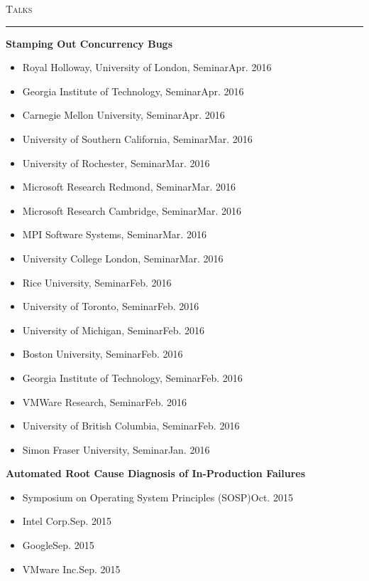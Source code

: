 \documentclass[10pt]{article}
\newcommand{\mysec}[1]{\vspace{2em}\textsc{\large #1}\vspace{1mm}\hrule\vspace{2mm}}
\newcommand{\mysub}[3]{\textbf{#1} {#2} \hfill {\em #3}}
\begin{document}
\mysec{Talks}
\mysub{Stamping Out Concurrency Bugs}{}{} 
\vspace{-2mm}
\begin{itemize}
\setlength\itemsep{0em}
\item{Royal Holloway, University of London, Seminar}\hfill Apr. 2016
\item{Georgia Institute of Technology, Seminar}\hfill Apr. 2016
\item{Carnegie Mellon University, Seminar}\hfill Apr. 2016
\item{University of Southern California, Seminar}\hfill Mar. 2016
\item{University of Rochester, Seminar}\hfill Mar. 2016
\item{Microsoft Research Redmond, Seminar}\hfill Mar. 2016
\item{Microsoft Research Cambridge, Seminar}\hfill Mar. 2016
\item{MPI Software Systems, Seminar}\hfill Mar. 2016
\item{University College London, Seminar}\hfill Mar. 2016
\item{Rice University, Seminar}\hfill Feb. 2016
\item{University of Toronto, Seminar}\hfill Feb. 2016
\item{University of Michigan, Seminar}\hfill Feb. 2016
\item{Boston University, Seminar}\hfill Feb. 2016
\item{Georgia Institute of Technology, Seminar}\hfill Feb. 2016
\item{VMWare Research, Seminar}\hfill Feb. 2016
\item{University of British Columbia, Seminar}\hfill Feb. 2016
\item{Simon Fraser University, Seminar}\hfill Jan. 2016
\end{itemize}
\mysub{Automated Root Cause Diagnosis of In-Production Failures}{}{} 
\vspace{-2mm}
\begin{itemize}
\setlength\itemsep{0em}
\item{Symposium on Operating System Principles (SOSP)}\hfill Oct. 2015
\item{Intel Corp.}\hfill Sep. 2015
\item{Google}\hfill Sep. 2015
\item{VMware Inc.}\hfill Sep. 2015
\end{itemize}

\newpage
\end{document}
